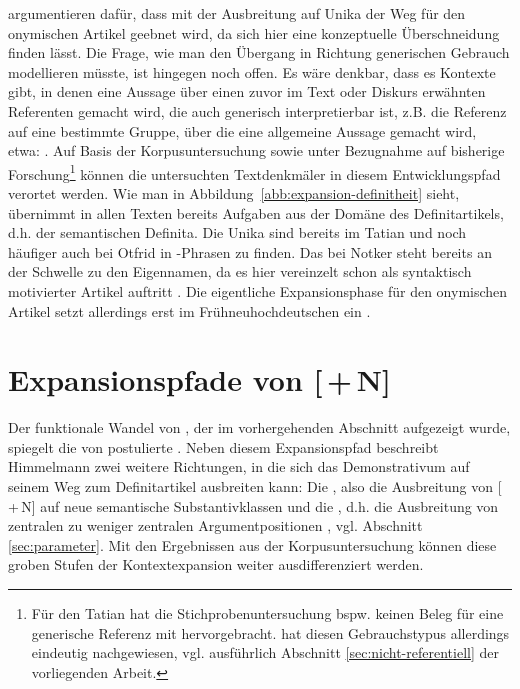 \textcite[105]{Schmuck2014} argumentieren dafür, dass mit der Ausbreitung auf Unika der Weg für den onymischen Artikel geebnet wird, da sich hier eine konzeptuelle Überschneidung finden lässt. Die Frage, wie man den Übergang in Richtung generischen Gebrauch modellieren müsste, ist hingegen noch offen. Es wäre denkbar, dass es Kontexte gibt, in denen eine Aussage über einen zuvor im Text oder Diskurs erwähnten Referenten gemacht wird, die auch generisch interpretierbar ist, z.B. die Referenz auf eine bestimmte Gruppe, über die eine allgemeine Aussage gemacht wird, etwa: . 
Auf Basis der Korpusuntersuchung sowie unter Bezugnahme auf bisherige Forschung\footnote{Für den Tatian hat die Stichprobenuntersuchung bspw. keinen Beleg für eine generische Referenz mit  hervorgebracht. \textcite{Oubouzar1992} hat diesen Gebrauchstypus allerdings eindeutig nachgewiesen, vgl. ausführlich Abschnitt \ref{sec:nicht-referentiell} der vorliegenden Arbeit.} können die untersuchten Textdenkmäler in diesem Entwicklungspfad verortet werden. Wie man in Abbildung~\ref{abb:expansion-definitheit} sieht, übernimmt   in allen Texten bereits Aufgaben aus der Domäne des Definitartikels, d.h. der semantischen Definita. Die Unika sind bereits im Tatian und noch häufiger auch bei Otfrid in -Phrasen zu finden. Das  bei Notker steht bereits an der Schwelle zu den Eigennamen, da es hier vereinzelt schon als syntaktisch motivierter Artikel auftritt \parencite[ , s.][638]{Oubouzar1989}.
Die eigentliche Expansionsphase für den onymischen Artikel setzt allerdings erst im Frühneuhochdeutschen ein \parencite{Schmuck2020}. 


\section{Expansionspfade von [\,+\,N]} \label{sec:disk-expansion}

Der funktionale Wandel von , der im vorhergehenden Abschnitt aufgezeigt wurde, spiegelt die von \textcite[32--33]{Himmelmann2004} postulierte . Neben diesem Expansionspfad beschreibt Himmelmann zwei weitere Richtungen, in die sich das Demonstrativum auf seinem Weg zum Definitartikel ausbreiten kann: Die , also die Ausbreitung von [\,+\,N] auf neue semantische Substantivklassen und die , d.h. die Ausbreitung von zentralen zu weniger zentralen Argumentpositionen \parencite[32--33]{Himmelmann2004}, vgl. Abschnitt \ref{sec:parameter}. Mit den Ergebnissen aus der Korpusuntersuchung können diese groben Stufen der Kontextexpansion weiter ausdifferenziert werden.  

